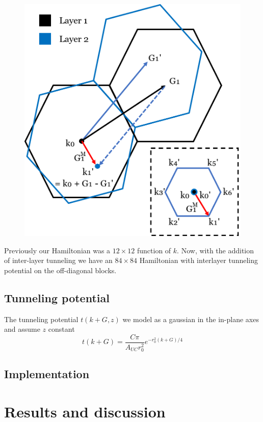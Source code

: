 \documentclass[10pt, twocolumn]{article} %
\begin{document}
\begin{figure}[t!]
\centering
\includegraphics[width=0.95\columnwidth]{k_prime_diagram.png}
  \caption{
  }
  \label{inter-layer_k_prime_diagram}
\end{figure}



  Previously our Hamiltonian was a $12\times12$ function of $k$. Now, with the  addition of inter-layer tunneling we have an $84\times84$ Hamiltonian with interlayer tunneling potential on the off-diagonal blocks.

\subsection*{Tunneling potential}

The tunneling potential $t(k + G, z)$ we model as a gaussian in the in-plane axes and assume $z$ constant
\begin{equation}
  t(k + G) = \frac{C\pi}{A_{UC} r_0^2}e^{- r_0^2 (k + G)/4}
\end{equation}

\subsection*{Implementation}

\section*{Results and discussion}
\end{document}
